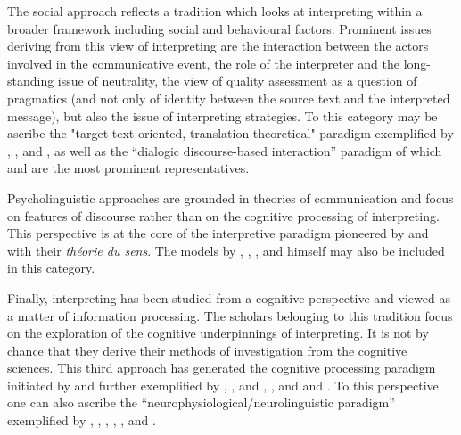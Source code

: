 The social approach reflects a tradition which looks at interpreting within a broader framework including social and behavioural factors. Prominent issues deriving from this view of interpreting are the interaction between the actors involved in the communicative event, the role of the interpreter and the long-standing issue of neutrality, the view of quality assessment as a question of pragmatics (and not only of identity between the source text and the interpreted message), but also the issue of interpreting strategies. To this category may be ascribe the "target-text oriented, translation-theoretical" \citep[77]{pochhacker_introducing_2004} paradigm exemplified by \citet{salevsky_probleme_1987}, \citet{schjoldager_an_1995/2002}, \citet{pochhacker_simultandolmetschen_1994} and \citet{kalina_strategische_1998}, as well as the ``dialogic discourse-based interaction'' paradigm \citep[79]{pochhacker_introducing_2004} of which \citet{roy_interactional_1996, roy_interpreting_2000} and \citet{wadensjo_double_1993, wadensjo_interpreting_1998} are the most prominent representatives.

Psycholinguistic approaches are grounded in theories of communication and focus on features of discourse rather than on the cognitive processing of interpreting. This perspective is at the core of the interpretive paradigm pioneered by \citet{seleskovitch_interpretation_1976} and \citet{lederer_traduction_1981} with their \textit{théorie du sens}. The models by \citet{chernov_semantic_1979, lambert_message_1994}, \citet{dejean_le_feal_satzsegmentierung_1980, dejean_le_feal_lectures_1981}, \citet{donovan_fidelite_1990}, \citet{laplace_theorie_1994} and \citet{setton_simultaneous_1999} himself may also be included in this category.

Finally, interpreting has been studied from a cognitive perspective and viewed as a matter of information processing. The scholars belonging to this tradition focus on the exploration of the cognitive underpinnings of interpreting. It is not by chance that they derive their methods of investigation from the cognitive sciences. This third approach has generated the cognitive processing paradigm \citep[73]{pochhacker_introducing_2004} initiated by \citet{gerver_empirical_1976} and further exemplified by \citet{lambert_information_1988}, \citet{gerver_information-processing_1978}, \citet{moser_simultaneous_1978} and \citet{hauenschild_process_1997}, \citet{kurz_simultandolmetschen_1996}, \citet{shlesinger_strategic_2000} and \citet{gile_partage_1988, gile_conference_1997, gile_testing_1999} and \citet{seeber_thinking_2007,seeber_cognitive_2011,seeber_multimodal_2017}. To this perspective one can also ascribe the ``neurophysiological/neurolinguistic paradigm'' \citep[75]{pochhacker_introducing_2004} exemplified by \citet{lambert_neurological_1994}, \citet{snell-hornby_look_1994,kurz_simultandolmetschen_1996}, \citet{lambert_non-linguistic_1994,daro_experimental_1997}, \citet{petsche_brain_1993}, \citet{rinne_translating_2000}, and \citet{tommola_mental_1990}.

